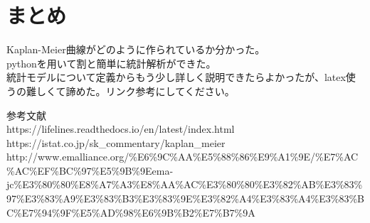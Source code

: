 \documentclass[11pt]{article}
\begin{document}
    \hypertarget{ux307eux3068ux3081}{%
\section{まとめ}\label{ux307eux3068ux3081}}

    Kaplan-Meier曲線がどのように作られているか分かった。\\
pythonを用いて割と簡単に統計解析ができた。\\
統計モデルについて定義からもう少し詳しく説明できたらよかったが、latex使うの難しくて諦めた。リンク参考にしてください。

    参考文献\\
https://lifelines.readthedocs.io/en/latest/index.html\\
https://istat.co.jp/sk\_commentary/kaplan\_meier\\
http://www.emalliance.org/\%E6\%9C\%AA\%E5\%88\%86\%E9\%A1\%9E/\%E7\%AC\%AC\%EF\%BC\%97\%E5\%9B\%9Eema-jc\%E3\%80\%80\%E8\%A7\%A3\%E8\%AA\%AC\%E3\%80\%80\%E3\%82\%AB\%E3\%83\%97\%E3\%83\%A9\%E3\%83\%B3\%E3\%83\%9E\%E3\%82\%A4\%E3\%83\%A4\%E3\%83\%BC\%E7\%94\%9F\%E5\%AD\%98\%E6\%9B\%B2\%E7\%B7\%9A


    
    
    
    
\end{document}
